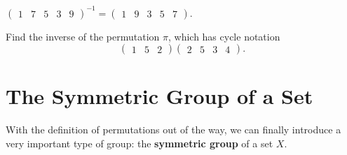 \begin{example}
    $\begin{pmatrix}1 & 7 & 5 & 3 & 9\end{pmatrix}^{-1} = \begin{pmatrix}1 & 9 & 3 & 5 & 7\end{pmatrix}$.
\end{example}

\begin{exercise}
    Find the inverse of the permutation $\pi$, which has cycle notation
    \[
        \begin{pmatrix}1 & 5 & 2\end{pmatrix}\begin{pmatrix}2 & 5 & 3 & 4\end{pmatrix}.
    \]
\end{exercise}

\section{The Symmetric Group of a Set}
With the definition of permutations out of the way, we can finally introduce a very important type of group: the \textbf{symmetric group} of a set $X$.

